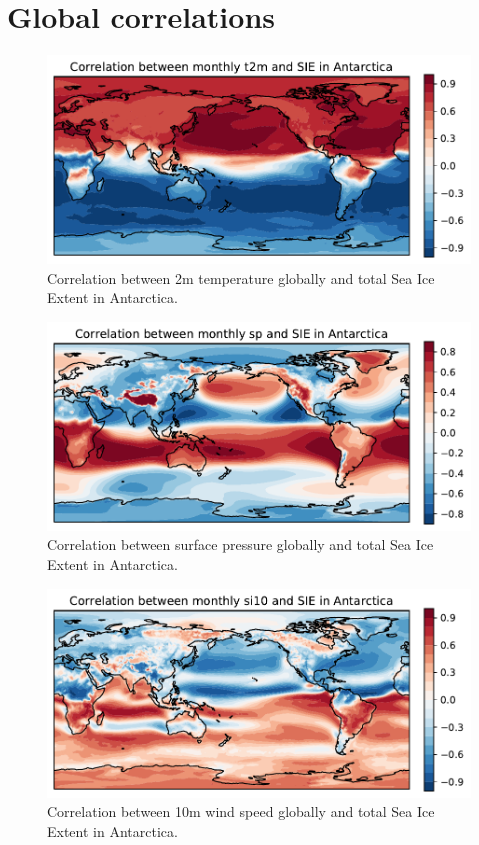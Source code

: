 \section{Global correlations}
\begin{figure}[H]
    \centering
    \includegraphics[width=\textwidth]{Images/global_correlation_monthly_t2m_sie.pdf}
    \caption{Correlation between 2m temperature globally and total Sea Ice Extent in Antarctica.}
    \label{fig:temp_sie_corr}
\end{figure}

\begin{figure}[H]
    \centering
    \includegraphics[width=\textwidth]{Images/global_correlation_monthly_sp_sie.pdf}
    \caption{Correlation between surface pressure globally and total Sea Ice Extent in Antarctica.}
    \label{fig:sp_sie_corr}
\end{figure}

\begin{figure}[H]
    \centering
    \includegraphics[width=\textwidth]{Images/global_correlation_monthly_si10_sie.pdf}
    \caption{Correlation between 10m wind speed globally and total Sea Ice Extent in Antarctica.}
    \label{fig:si10_sie_corr}
\end{figure}

